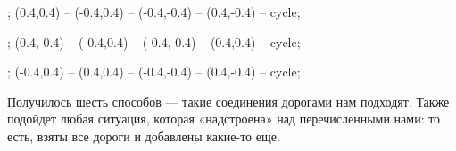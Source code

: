 \begin{itemize}
\begin{center}
{\begin{scope}[xshift=-2.2cm,yshift=-1.5cm]
	\cities; 
	\dwt (0.4,0.4) -- (-0.4,0.4) -- (-0.4,-0.4) -- (0.4,-0.4) -- cycle; 
\end{scope}

\begin{scope}[xshift=0cm,yshift=-1.5cm]
	\cities; 
	\dwt (0.4,-0.4) -- (-0.4,0.4) -- (-0.4,-0.4) -- (0.4,0.4) -- cycle; 
\end{scope}

\begin{scope}[xshift=2.2cm,yshift=-1.5cm]
	\cities; 
	\dwt (-0.4,0.4) -- (0.4,0.4) -- (-0.4,-0.4) -- (0.4,-0.4) -- cycle; 
\end{scope}

}\end{center}

Получилось шесть способов — такие соединения дорогами нам подходят. Также подойдет любая ситуация, которая «надстроена» над перечисленными нами: то есть, взяты все дороги и добавлены какие-то еще.
\end{itemize}
